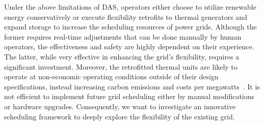 Under the above limitations of DAS, operators either choose to utilize renewable energy conservatively or execute flexibility retrofits to thermal generators and expand storage to increase the scheduling resources of power grids. 
Although the former requires real-time adjustments that can be done manually by human operators, the effectiveness and safety are highly dependent on their experience. The latter, while very effective in enhancing the grid's flexibility, requires a significant investment. 
Moreover, the retrofitted thermal units are likely to operate at non-economic operating conditions outside of their design specifications, instead increasing carbon emissions and costs per megawatts~\cite{chen2021flexible}. 
It is not efficient to implement future grid scheduling either by manual modifications or hardware upgrades.
Consequently, we want to investigate an innovative scheduling framework to deeply explore the flexibility of the existing grid.


